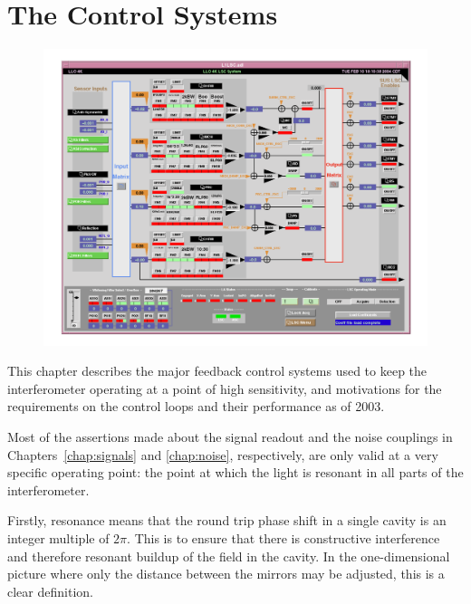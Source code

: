 \chapter{The Control Systems}
\label{chap:controls}

\begin{figure}[!h]
\centerline{\includegraphics[angle=0,width=6.5in]{Figures/Chap5/L1LSC.pdf}}
\label{fig:LSCscreen}
\end{figure}
\clearpage

This chapter describes the major feedback control systems used to keep
the interferometer operating at a point of high sensitivity, and
motivations for the requirements on the control loops and their performance
as of 2003.

Most of the assertions made about the signal readout and the noise couplings
in Chapters~\ref{chap:signals}  and \ref{chap:noise}, respectively, are only 
valid at a very specific operating point: the point at which 
the light is resonant in all parts of the interferometer.

Firstly, resonance means that the round trip phase shift in a single cavity is 
an integer multiple of $2 \pi$. This is to ensure that there is constructive
interference and therefore resonant buildup of the field in the cavity.
In the one-dimensional picture where only the distance between the mirrors
may be adjusted, this is a clear definition.

